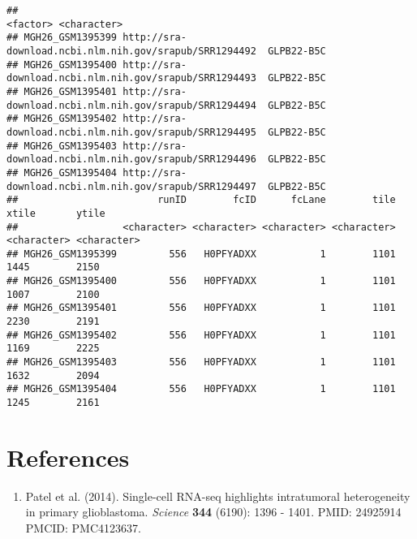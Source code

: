 \documentclass{article}\usepackage[]{graphicx}\usepackage[usenames,dvipsnames]{color}
\makeatletter
\newenvironment{kframe}{%
 \def\at@end@of@kframe{}%
 \ifinner\ifhmode%
  \def\at@end@of@kframe{\end{minipage}}%
  \begin{minipage}{\columnwidth}%
 \fi\fi%
 \def\FrameCommand##1{\hskip\@totalleftmargin \hskip-\fboxsep
 \colorbox{shadecolor}{##1}\hskip-\fboxsep
     \hskip-\linewidth \hskip-\@totalleftmargin \hskip\columnwidth}%
 \MakeFramed {\advance\hsize-\width
   \@totalleftmargin\z@ \linewidth\hsize
   \@setminipage}}%
 {\par\unskip\endMakeFramed%
 \at@end@of@kframe}
\newenvironment{knitrout}{}{} %
\makeatother
\begin{document}
\begin{knitrout}
\begin{kframe}
\begin{verbatim}
##                                                                <factor> <character>
## MGH26_GSM1395399 http://sra-download.ncbi.nlm.nih.gov/srapub/SRR1294492  GLPB22-B5C
## MGH26_GSM1395400 http://sra-download.ncbi.nlm.nih.gov/srapub/SRR1294493  GLPB22-B5C
## MGH26_GSM1395401 http://sra-download.ncbi.nlm.nih.gov/srapub/SRR1294494  GLPB22-B5C
## MGH26_GSM1395402 http://sra-download.ncbi.nlm.nih.gov/srapub/SRR1294495  GLPB22-B5C
## MGH26_GSM1395403 http://sra-download.ncbi.nlm.nih.gov/srapub/SRR1294496  GLPB22-B5C
## MGH26_GSM1395404 http://sra-download.ncbi.nlm.nih.gov/srapub/SRR1294497  GLPB22-B5C
##                        runID        fcID      fcLane        tile       xtile       ytile
##                  <character> <character> <character> <character> <character> <character>
## MGH26_GSM1395399         556   H0PFYADXX           1        1101        1445        2150
## MGH26_GSM1395400         556   H0PFYADXX           1        1101        1007        2100
## MGH26_GSM1395401         556   H0PFYADXX           1        1101        2230        2191
## MGH26_GSM1395402         556   H0PFYADXX           1        1101        1169        2225
## MGH26_GSM1395403         556   H0PFYADXX           1        1101        1632        2094
## MGH26_GSM1395404         556   H0PFYADXX           1        1101        1245        2161
\end{verbatim}
\end{kframe}
\end{knitrout}

\section{References}

\begin{enumerate}

\item Patel et al. (2014). Single-cell RNA-seq highlights 
intratumoral heterogeneity in primary glioblastoma. 
\textit{Science} \textbf{344} (6190): 1396 - 1401.
PMID: 24925914 PMCID: PMC4123637.


\end{enumerate}
\end{document}
